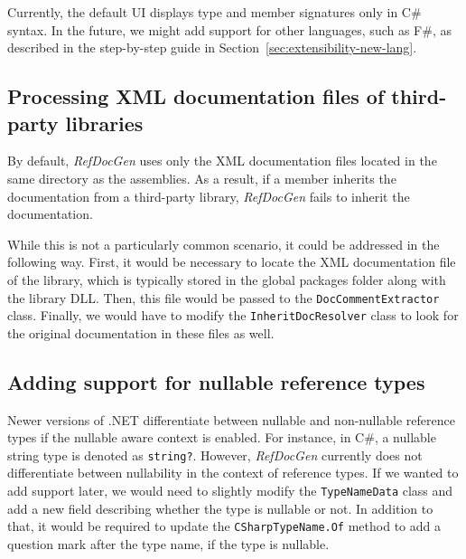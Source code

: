Currently, the default UI displays type and member signatures only in C\# syntax.
In the future, we might add support for other languages, such as F\#, as described in the step-by-step guide in Section~\ref{sec:extensibility-new-lang}.

\subsection*{Processing XML documentation files of third-party libraries}

By default, \textit{RefDocGen} uses only the XML documentation files located in the same directory as the assemblies.
As a result, if a member inherits the documentation from a third-party library, \textit{RefDocGen} fails to inherit the documentation.

While this is not a particularly common scenario, it could be addressed in the following way.
First, it would be necessary to locate the XML documentation file of the library, which is typically stored in the global packages folder along with the library DLL.
Then, this file would be passed to the \texttt{DocCommentExtractor} class.
Finally, we would have to modify the \texttt{InheritDocResolver} class to look for the original documentation in these files as well.

\subsection*{Adding support for nullable reference types}
Newer versions of .NET differentiate between nullable and non-nullable reference types if the nullable aware context is enabled.
For instance, in C\#, a nullable string type is denoted as \texttt{string?}.
However, \textit{RefDocGen} currently does not differentiate between nullability in the context of reference types.
If we wanted to add support later, we would need to slightly modify the \texttt{TypeNameData} class and add a new field describing whether the type is nullable or not.
In addition to that, it would be required to update the \texttt{CSharpTypeName.Of} method to add a question mark after the type name, if the type is nullable.
